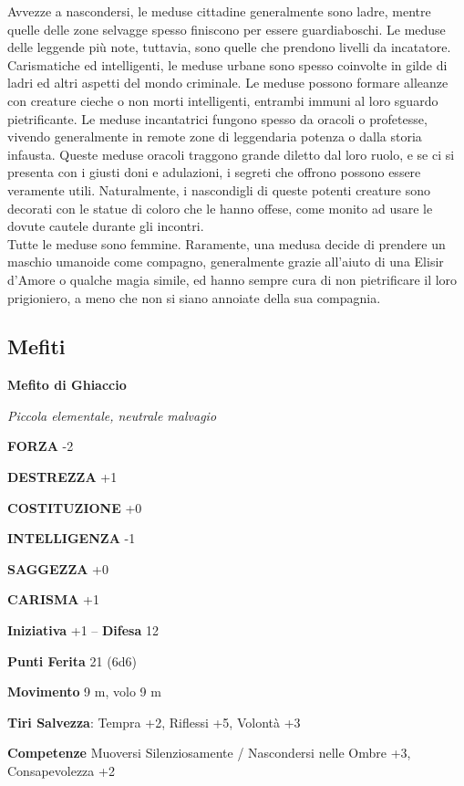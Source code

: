 \begin{multicols}{2}
Avvezze a nascondersi, le meduse cittadine generalmente sono ladre, mentre quelle delle zone selvagge spesso finiscono per essere guardiaboschi. Le meduse delle leggende più note, tuttavia, sono quelle che prendono livelli da incatatore. Carismatiche ed intelligenti, le meduse urbane sono spesso coinvolte in gilde di ladri ed altri aspetti del mondo criminale. Le meduse possono formare alleanze con creature cieche o non morti intelligenti, entrambi immuni al loro sguardo pietrificante. Le meduse incantatrici fungono spesso da oracoli o profetesse, vivendo generalmente in remote zone di leggendaria potenza o dalla storia infausta. Queste meduse oracoli traggono grande diletto dal loro ruolo, e se ci si presenta con i giusti doni e adulazioni, i segreti che offrono possono essere veramente utili. Naturalmente, i nascondigli di queste potenti creature sono decorati con le statue di coloro che le hanno offese, come monito ad usare le dovute cautele durante gli incontri.\\

Tutte le meduse sono femmine. Raramente, una medusa decide di prendere un maschio umanoide come compagno, generalmente grazie all'aiuto di una Elisir d'Amore o qualche magia simile, ed hanno sempre cura di non pietrificare il loro prigioniero, a meno che non si siano annoiate della sua compagnia.\\


\subsection{Mefiti}

\medskip{}\textbf{Mefito di Ghiaccio}

\emph{Piccola elementale, neutrale malvagio}

\textbf{FORZA} -2

\textbf{DESTREZZA} +1

\textbf{COSTITUZIONE} +0

\textbf{INTELLIGENZA} -1

\textbf{SAGGEZZA} +0

\textbf{CARISMA} +1

\textbf{Iniziativa} +1 -- \textbf{Difesa} 12

\textbf{Punti Ferita} 21 (6d6)

\textbf{Movimento} 9 m, volo 9 m

\textbf{Tiri Salvezza}: Tempra +2, Riflessi +5, Volontà +3

\textbf{Competenze} Muoversi Silenziosamente / Nascondersi nelle Ombre +3, Consapevolezza +2


\end{multicols}
